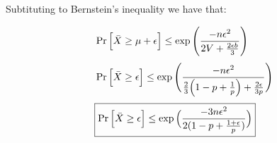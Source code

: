 Subtituting to Bernstein's inequality we have that:

\begin{align*}
&\Pr\Big[\bar{X} \ge \mu + \epsilon \Big] 
\le \exp\Bigg( \frac{-n\epsilon^2}{2V + \frac{2\epsilon b}{3}} \Bigg) \\[1mm]
&\Pr\Big[\bar{X} \ge \epsilon \Big] 
\le \exp\Bigg( \frac{-n\epsilon^2}{\frac{2}{3}\Big(1-p+\frac{1}{p}\Big) + \frac{2\epsilon}{3p}} \Bigg) \\[1mm]
&\textcolor{black}{\boxed{\Pr\Big[\bar{X} \ge \epsilon \Big] \le \exp\Big( \frac{-3 n \epsilon^2}{2(1-p+\frac{1+\epsilon}{p})} \Big)}} 
\end{align*}


